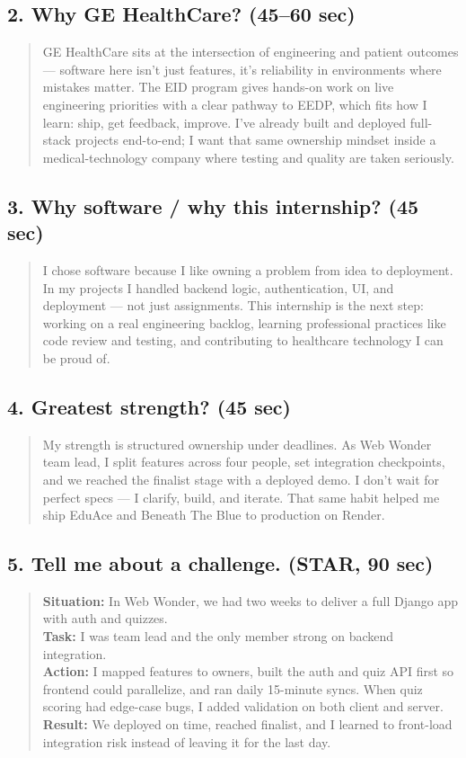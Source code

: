 \documentclass[11pt,a4paper]{article}
\newcommand{\Q}[1]{\textbf{\color{q}#1}}
\newcommand{\Say}[1]{\begin{quote}\small #1\end{quote}}
\begin{document}
\subsection{\Q{2. Why GE HealthCare?} (45--60 sec)}
\Say{
GE HealthCare sits at the intersection of engineering and patient outcomes --- software here isn't just features, it's reliability in environments where mistakes matter. The EID program gives hands-on work on live engineering priorities with a clear pathway to EEDP, which fits how I learn: ship, get feedback, improve. I've already built and deployed full-stack projects end-to-end; I want that same ownership mindset inside a medical-technology company where testing and quality are taken seriously.
}

\subsection{\Q{3. Why software / why this internship?} (45 sec)}
\Say{
I chose software because I like owning a problem from idea to deployment. In my projects I handled backend logic, authentication, UI, and deployment --- not just assignments. This internship is the next step: working on a real engineering backlog, learning professional practices like code review and testing, and contributing to healthcare technology I can be proud of.
}

\subsection{\Q{4. Greatest strength?} (45 sec)}
\Say{
My strength is structured ownership under deadlines. As Web Wonder team lead, I split features across four people, set integration checkpoints, and we reached the finalist stage with a deployed demo. I don't wait for perfect specs --- I clarify, build, and iterate. That same habit helped me ship EduAce and Beneath The Blue to production on Render.
}

\subsection{\Q{5. Tell me about a challenge.} (STAR, 90 sec)}
\Say{
\textbf{Situation:} In Web Wonder, we had two weeks to deliver a full Django app with auth and quizzes.\\
\textbf{Task:} I was team lead and the only member strong on backend integration.\\
\textbf{Action:} I mapped features to owners, built the auth and quiz API first so frontend could parallelize, and ran daily 15-minute syncs. When quiz scoring had edge-case bugs, I added validation on both client and server.\\
\textbf{Result:} We deployed on time, reached finalist, and I learned to front-load integration risk instead of leaving it for the last day.
}
\end{document}
